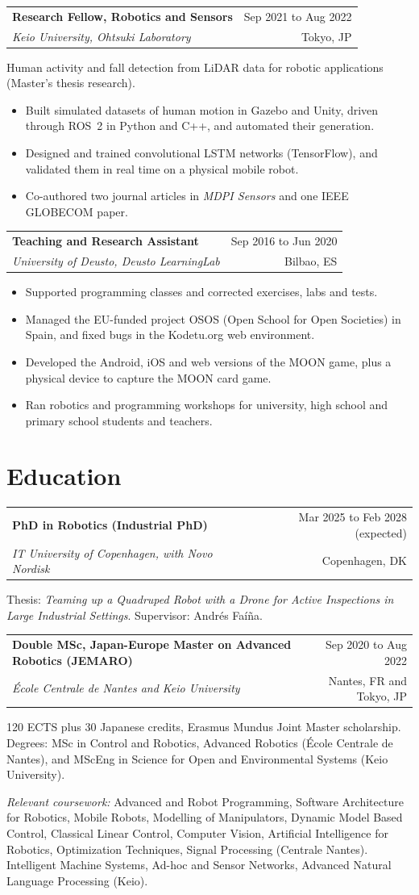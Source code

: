 \documentclass[a4paper,11pt]{article}
\makeatletter
\newcommand{\entry}[4]{%
    \noindent\begin{tabularx}{\linewidth}{@{}>{\raggedright\arraybackslash}X r@{}}
        \textbf{#1} & #2\\
        \textit{#3} & #4
    \end{tabularx}\par}
\makeatother
\begin{document}
\entry{Research Fellow, Robotics and Sensors}{Sep 2021 to Aug 2022}{Keio University, Ohtsuki Laboratory}{Tokyo, JP}
Human activity and fall detection from LiDAR data for robotic applications (Master's thesis research).
\begin{itemize}
    \item Built simulated datasets of human motion in Gazebo and Unity, driven through ROS~2 in Python and C++, and automated their generation.
    \item Designed and trained convolutional LSTM networks (TensorFlow), and validated them in real time on a physical mobile robot.
    \item Co-authored two journal articles in \textit{MDPI Sensors} and one IEEE GLOBECOM paper.
\end{itemize}

\entry{Teaching and Research Assistant}{Sep 2016 to Jun 2020}{University of Deusto, Deusto LearningLab}{Bilbao, ES}
\begin{itemize}
    \item Supported programming classes and corrected exercises, labs and tests.
    \item Managed the EU-funded project OSOS (Open School for Open Societies) in Spain, and fixed bugs in the Kodetu.org web environment.
    \item Developed the Android, iOS and web versions of the MOON game, plus a physical device to capture the MOON card game.
    \item Ran robotics and programming workshops for university, high school and primary school students and teachers.
\end{itemize}

\section{Education}

\entry{PhD in Robotics (Industrial PhD)}{Mar 2025 to Feb 2028 (expected)}{IT University of Copenhagen, with Novo Nordisk}{Copenhagen, DK}
Thesis: \textit{Teaming up a Quadruped Robot with a Drone for Active Inspections in Large Industrial Settings}. Supervisor: Andrés Faíña.

\entry{Double MSc, Japan-Europe Master on Advanced Robotics (JEMARO)}{Sep 2020 to Aug 2022}{École Centrale de Nantes and Keio University}{Nantes, FR and Tokyo, JP}
120 ECTS plus 30 Japanese credits, Erasmus Mundus Joint Master scholarship. Degrees: MSc in Control and Robotics, Advanced Robotics (École Centrale de Nantes), and MScEng in Science for Open and Environmental Systems (Keio University).\\
{\raggedright\textit{Relevant coursework:} Advanced and Robot Programming, Software Architecture for Robotics, Mobile Robots, Modelling of Manipulators, Dynamic Model Based Control, Classical Linear Control, Computer Vision, Artificial Intelligence for Robotics, Optimization Techniques, Signal Processing (Centrale Nantes). Intelligent Machine Systems, Ad-hoc and Sensor Networks, Advanced Natural Language Processing (Keio).\par}
\end{document}
